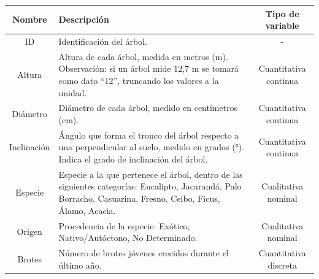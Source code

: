 \documentclass[11pt]{article}
\begin{document}
\begin{center}
  \begin{tabular}{| c | p{9cm} | c |}
    \hline
    \textbf{Nombre}                                                          & \textbf{Descripción}                                                 & \textbf{Tipo de variable} \\ \hline
    ID                                                                       & Identificación del árbol.                                            & -                         \\ \hline
    Altura                                                                   & Altura de cada árbol, medida en metros (m). Observación: si un árbol
    mide 12,7 m se tomará como dato “12”, truncando los valores a la unidad. &
    Cuantitativa continua                                                                                                                                                       \\ \hline
    Diámetro                                                                 & Diámetro de cada árbol, medido en centímetros (cm).                  &
    Cuantitativa continua                                                                                                                                                       \\ \hline
    Inclinación                                                              & Ángulo que forma el tronco del árbol respecto
    a una perpendicular al suelo, medido en grados (°).
    Indica el grado de inclinación del árbol.                                & Cuantitativa continua                                                                            \\ \hline
    Especie                                                                  & Especie a la que pertenece el árbol, dentro de las siguientes
    categorías: Eucalipto, Jacarandá, Palo Borracho, Casuarina, Fresno, Ceibo,
    Ficus, Álamo, Acacia.                                                    & Cualitativa nominal                                                                              \\ \hline
    Origen                                                                   & Procedencia de la especie: Exótico, Nativo/Autóctono,
    No Determinado.                                                          & Cualitativa nominal                                                                              \\ \hline
    Brotes                                                                   & Número de brotes jóvenes crecidos durante el último año.             &
    Cuantitativa discreta                                                                                                                                                       \\ \hline
  \end{tabular}
\end{center}
\end{document}
